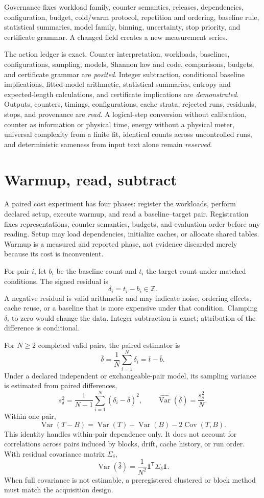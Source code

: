 Governance fixes workload family, counter semantics, releases, dependencies, configuration, budget, cold/warm
protocol, repetition and ordering, baseline rule, statistical summaries, model family, binning, uncertainty, stop
priority, and certificate grammar.  A changed field creates a new measurement series.

The action ledger is exact.  Counter interpretation, workloads, baselines, configurations, sampling, models, Shannon
law and code, comparisons, budgets, and certificate grammar are \emph{posited}.  Integer subtraction, conditional
baseline implications, fitted-model arithmetic, statistical summaries, entropy and expected-length calculations, and
certificate implications are \emph{demonstrated}.  Outputs, counters, timings, configurations, cache strata, rejected
runs, residuals, stops, and provenance are \emph{read}.  A logical-step conversion without calibration, counter as
information or physical time, energy without a physical meter, universal complexity from a finite fit, identical
counts across uncontrolled runs, and deterministic sameness from input text alone remain \emph{reserved}.
\section{Warmup, read, subtract}

A paired cost experiment has four phases: register the workloads, perform declared setup, execute warmup, and read a
baseline--target pair.  Registration fixes representations, counter semantics, budgets, and evaluation order before
any reading.  Setup may load dependencies, initialize caches, or allocate shared tables.  Warmup is a measured and
reported phase, not evidence discarded merely because its cost is inconvenient.

For pair \(i\), let \(b_i\) be the baseline count and \(t_i\) the target count under matched conditions.  The signed
residual is
\[
                         \delta_i=t_i-b_i\in\mathbb Z.
\]
A negative residual is valid arithmetic and may indicate noise, ordering effects, cache reuse, or a baseline that is
more expensive under that condition.  Clamping \(\delta_i\) to zero would change the data.  Integer subtraction is
exact; attribution of the difference is conditional.

For \(N\geq2\) completed valid pairs, the paired estimator is
\[
                         \bar\delta=\frac1N\sum_{i=1}^N\delta_i
                         =\bar t-\bar b.
\]
Under a declared independent or exchangeable-pair model, its sampling variance is estimated from paired differences,
\[
 s_\delta^2=\frac{1}{N-1}\sum_{i=1}^N(\delta_i-\bar\delta)^2,\qquad
 \widehat{\operatorname{Var}}(\bar\delta)=\frac{s_\delta^2}{N}.
\]
Within one pair,
\[
\operatorname{Var}(T-B)=\operatorname{Var}(T)+\operatorname{Var}(B)
-2\operatorname{Cov}(T,B).
\]
This identity handles within-pair dependence only.  It does not account for correlations across pairs induced by
blocks, drift, cache history, or run order.  With residual covariance matrix \(\Sigma_\delta\),
\[
 \operatorname{Var}(\bar\delta)
 =\frac{1}{N^2}\mathbf1^{\mathsf T}\Sigma_\delta\mathbf1.
\]
When full covariance is not estimable, a preregistered clustered or block method must match the acquisition design.

